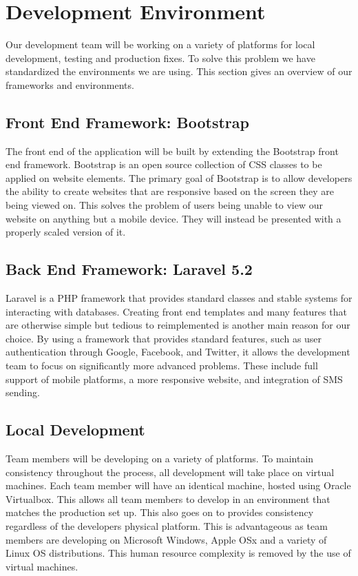 \documentclass[]{article}
\begin{document}
\section{Development Environment}
Our development team will be working on a variety of platforms for local development, testing and production fixes. To solve this problem we have standardized the environments we are using. This section gives an overview of our frameworks and environments.
\subsection{Front End Framework: Bootstrap}
The front end of the application will be built by extending the Bootstrap front end framework. Bootstrap is an open source collection of CSS classes to be applied on website elements. The primary goal of Bootstrap is to allow developers the ability to create websites that are responsive based on the screen they are being viewed on. This solves the problem of users being unable to view our website on anything but a mobile device. They will instead be presented with a properly scaled version of it.
\subsection{Back End Framework: Laravel 5.2}
Laravel is a PHP framework that provides standard classes and stable systems for interacting with databases. Creating front end templates and many features that are otherwise simple but tedious to reimplemented is another main reason for our choice. By using a framework that provides standard features, such as user authentication through Google, Facebook, and Twitter, it allows the development team to focus on significantly more advanced problems. These include full support of mobile platforms, a more responsive website, and integration of SMS sending.
\subsection{Local Development}
Team members will be developing on a variety of platforms. To maintain consistency throughout the process, all development will take place on virtual machines. Each team member will have an identical machine, hosted using Oracle Virtualbox. This allows all team members to develop in an environment that matches the production set up. This also goes on to provides consistency regardless of the developers physical platform. This is advantageous as team members are developing on Microsoft Windows, Apple OSx and a variety of Linux OS distributions. This human resource complexity is removed by the use of virtual machines.
\end{document}
